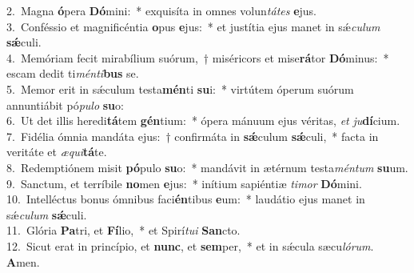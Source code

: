 {2.~}Magna \textbf{ó}pera \textbf{Dó}mini:~* exquisíta in omnes volun\textit{tá}\textit{tes} \textbf{e}jus.\\
{3.~}Conféssio et magnificéntia \textbf{o}pus \textbf{e}jus:~* et justítia ejus manet in sǽ\textit{cu}\textit{lum} \textbf{sǽ}culi.\\
{4.~}Memóriam fecit mirabílium suórum,~† miséricors et mise\textbf{rá}tor \textbf{Dó}minus:~* escam dedit ti\textit{mén}\textit{ti}\textbf{bus} se.\\
{5.~}Memor erit in sǽculum testa\textbf{mén}ti \textbf{su}i:~* virtútem óperum suórum annuntiábit pó\textit{pu}\textit{lo} \textbf{su}o:\\
{6.~}Ut det illis heredi\textbf{tá}tem \textbf{gén}tium:~* ópera mánuum ejus véritas, \textit{et} \textit{ju}\textbf{dí}cium.\\
{7.~}Fidélia ómnia mandáta ejus:~† confirmáta in \textbf{sǽ}culum \textbf{sǽ}culi,~* facta in veritáte et \textit{æ}\textit{qui}\textbf{tá}te.\\
{8.~}Redemptiónem misit \textbf{pó}pulo \textbf{su}o:~* mandávit in ætérnum testa\textit{mén}\textit{tum} \textbf{su}um.\\
{9.~}Sanctum, et terríbile \textbf{no}men \textbf{e}jus:~* inítium sapiéntiæ \textit{ti}\textit{mor} \textbf{Dó}mini.\\
{10.~}Intelléctus bonus ómnibus faci\textbf{én}tibus \textbf{e}um:~* laudátio ejus manet in sǽ\textit{cu}\textit{lum} \textbf{sǽ}culi.\\
{11.~}Glória \textbf{Pa}tri, et \textbf{Fí}lio,~* et Spirí\textit{tu}\textit{i} \textbf{San}cto.\\
{12.~}Sicut erat in princípio, et \textbf{nunc}, et \textbf{sem}per,~* et in sǽcula sæcu\textit{ló}\textit{rum}. \textbf{A}men.\\
